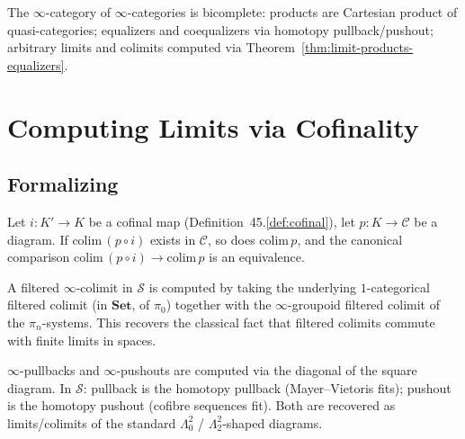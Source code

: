 \begin{example_thm}
\label{ex:Cat-infty-bicomplete}
The $\infty$-category of $\infty$-categories is bicomplete: products are
Cartesian product of quasi-categories; equalizers and coequalizers via
homotopy pullback/pushout; arbitrary limits and colimits computed via
Theorem~\ref{thm:limit-products-equalizers}.
\end{example_thm}


\section{Computing Limits via Cofinality}
\label{sec:limits-cofinality}

\subsection{Formalizing}

\begin{theorem}
\label{thm:cofinality-colim}
Let $i : K' \to K$ be a cofinal map (Definition~45.\ref{def:cofinal}),
let $p : K \to \mathcal{C}$ be a diagram. If $\mathrm{colim}\,(p \circ i)$
exists in $\mathcal{C}$, so does $\mathrm{colim}\, p$, and the canonical
comparison $\mathrm{colim}\, (p \circ i) \to \mathrm{colim}\, p$ is an
equivalence.
\end{theorem}

\begin{example_thm}
\label{ex:filtered-colim-S}
A filtered $\infty$-colimit in $\mathcal{S}$ is computed by taking the
underlying $1$-categorical filtered colimit (in $\mathbf{Set}$, of $\pi_0$)
together with the $\infty$-groupoid filtered colimit of the
$\pi_n$-systems. This recovers the classical fact that filtered colimits
commute with finite limits in spaces.
\end{example_thm}

\begin{example_thm}
\label{ex:pushouts-pullbacks}
$\infty$-pullbacks and $\infty$-pushouts are computed via the diagonal
of the square diagram. In $\mathcal{S}$: pullback is the homotopy
pullback (Mayer–Vietoris fits); pushout is the homotopy pushout (cofibre
sequences fit). Both are recovered as limits/colimits of the standard
$\Lambda^2_0$ / $\Lambda^2_2$-shaped diagrams.
\end{example_thm}

